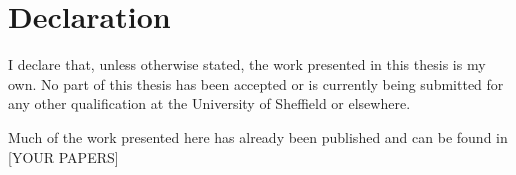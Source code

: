 \chapter*{Declaration}
\label{chpt:declaration} 
I declare that, unless otherwise stated, the work presented in this thesis is my own. 
No part of this thesis has been accepted or is currently being submitted for any other qualification at the University of Sheffield or elsewhere.

Much of the work presented here has already been published and can be found in [YOUR PAPERS]